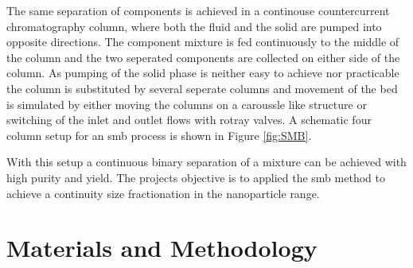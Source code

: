 The same separation of components is achieved in a continouse countercurrent chromatography column, where both the fluid and the solid are pumped into opposite directions. The component mixture is fed continuously to the middle of the column and the two seperated components are collected on either side of the column. As pumping of the solid phase is neither easy to achieve nor practicable the column is substituted by several seperate columns  and movement of the bed is simulated by either moving the columns on a caroussle like structure or switching of the inlet and outlet flows with rotray valves. A schematic four column setup for an \gls{smb} process is shown in Figure \ref{fig:SMB}.

\begin{figure}[H]
\centering
{}
\end{figure}

With this setup a continuous binary separation of a mixture can be achieved with high purity and yield. The projects objective is to applied the \gls{smb} method to achieve a continuity size fractionation in the nanoparticle range.   


\chapter{Materials and Methodology}
\label{chap:chap_mat}

